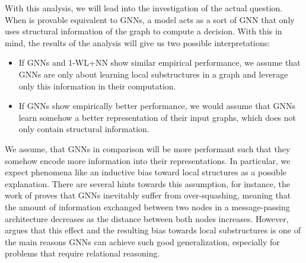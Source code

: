 \documentclass[11pt, dvipsnames, DIV=12]{scrreprt}
\theoremstyle{definition}
\newcommand{\wlnn}{\text{1-WL+NN }}
\begin{document}
With this analysis, we will lead into the investigation of the actual question. When \wlnn is provable equivalent to GNNs, a \wlnn model acts as a sort of GNN that only uses structural information of the graph to compute a decision. With this in mind, the results of the analysis will give us two possible interpretations:
\begin{itemize}
    \item If GNNs and 1-WL+NN show similar empirical performance, we assume that GNNs are only about learning local substructures in a graph and leverage only this information in their computation.
    \item If GNNs show empirically better performance, we would assume that GNNs learn somehow a better representation of their input graphs, which does not only contain structural information.
\end{itemize}
We assume, that GNNs in comparison will be more performant such that they somehow encode more information into their representations. In particular, we expect phenomena like an inductive bias toward local structures as a possible explanation. There are several hints towards this assumption, for instance, the work of \cite{Giovanni2023} proves that GNNs inevitably suffer from over-squashing, meaning that the amount of information exchanged between two nodes in a message-passing architecture decreases as the distance between both nodes increases. However, \cite{Vignac2020} argues that this effect and the resulting bias towards local substructures is one of the main reasons GNNs can achieve such good generalization, especially for problems that require relational reasoning.



\end{document}
